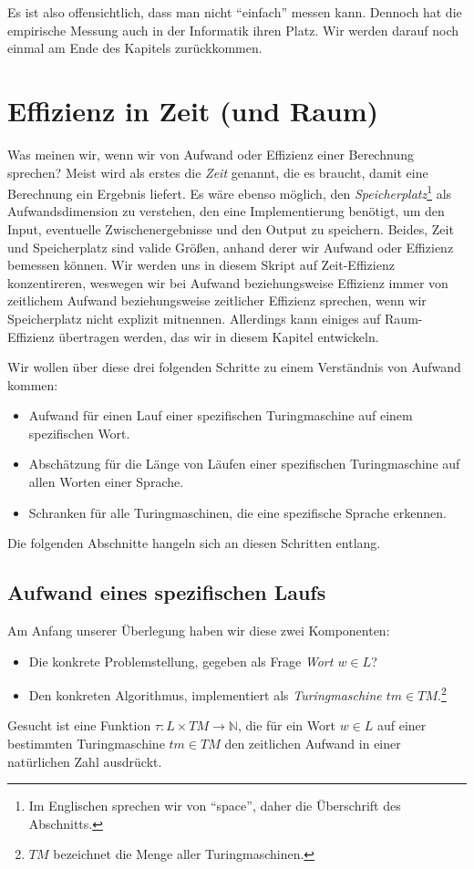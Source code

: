 Es ist also offensichtlich,
dass man nicht ``einfach'' messen kann.
Dennoch hat die empirische Messung auch in der Informatik ihren Platz.
Wir werden darauf noch einmal am Ende des Kapitels zurückkommen.

\section{Effizienz in Zeit (und Raum)}

Was meinen wir, wenn wir von Aufwand oder Effizienz einer Berechnung sprechen?
Meist wird als erstes die \emph{Zeit} genannt,
die es braucht,
damit eine Berechnung ein Ergebnis liefert.
Es wäre ebenso möglich,
den \emph{Speicherplatz}\footnote{
    Im Englischen sprechen wir von ``space'', daher die Überschrift des Abschnitts.}
als Aufwandsdimension zu verstehen,
den eine Implementierung benötigt,
um den Input,
eventuelle Zwischenergebnisse
und den Output zu speichern.
Beides, Zeit und Speicherplatz sind valide Größen,
anhand derer wir Aufwand oder Effizienz bemessen können.
Wir werden uns in diesem Skript auf Zeit-Effizienz konzentireren,
weswegen wir bei Aufwand beziehungsweise Effizienz immer von
zeitlichem Aufwand beziehungsweise zeitlicher Effizienz sprechen,
wenn wir Speicherplatz nicht explizit mitnennen.
Allerdings kann einiges auf Raum-Effizienz übertragen werden,
das wir in diesem Kapitel entwickeln.

Wir wollen über diese drei folgenden Schritte zu einem Verständnis von Aufwand kommen:
\begin{itemize}
    \item Aufwand für einen Lauf einer spezifischen Turingmaschine auf einem spezifischen Wort.
    \item Abschätzung für die Länge von Läufen einer spezifischen Turingmaschine
        auf allen Worten einer Sprache.
    \item Schranken für alle Turingmaschinen, die eine spezifische Sprache erkennen.
\end{itemize}

Die folgenden Abschnitte hangeln sich an diesen Schritten entlang.

\subsection{Aufwand eines spezifischen Laufs}
Am Anfang unserer Überlegung haben wir diese zwei Komponenten:
\begin{itemize}
    \item Die konkrete Problemstellung, gegeben als Frage \emph{Wort $w \in L$}? 
    \item Den konkreten Algorithmus,
        implementiert als \emph{Turingmaschine $tm \in TM$}.\footnote{
            $TM$ bezeichnet die Menge aller Turingmaschinen.}
\end{itemize}
Gesucht ist eine Funktion $\tau: L \times TM \rightarrow \mathbb{N}$,
die für ein Wort $w \in L$ auf einer bestimmten Turingmaschine $tm \in TM$
den zeitlichen Aufwand in einer natürlichen Zahl ausdrückt.

